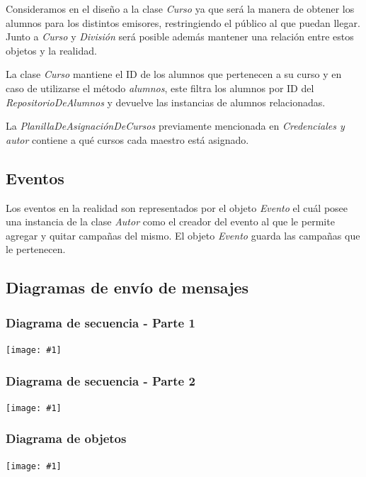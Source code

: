\documentclass[a4paper, 10pt, twoside]{article}
\newcommand{\grafico}[1]{
  \begin{center}
    \texttt{[image: \#1]}
  \end{center}
}
\begin{document}
Consideramos en el diseño a la clase \textit{Curso} ya que será la manera de obtener los alumnos para los distintos 
emisores, restringiendo el público al que puedan llegar. Junto a \textit{Curso} y \textit{División} será posible 
además mantener una relación entre estos objetos y la realidad.

La clase \textit{Curso} mantiene el ID de los alumnos que pertenecen a su curso y en caso de 
utilizarse el método \textit{alumnos}, este filtra los alumnos por ID del \textit{RepositorioDeAlumnos} y 
devuelve las instancias de alumnos relacionadas.

La \textit{PlanillaDeAsignaciónDeCursos} previamente mencionada en \textit{Credenciales y autor} contiene a qué 
cursos cada maestro está asignado.

\subsection{Eventos}
Los eventos en la realidad son representados por el objeto \textit{Evento} el cuál posee una instancia de la clase 
\textit{Autor} como el creador del evento al que le permite agregar y quitar campañas del mismo. El objeto 
\textit{Evento} guarda las campañas que le pertenecen.

\subsection{Diagramas de envío de mensajes}

\subsubsection{Diagrama de secuencia - Parte 1}
\label{sec-envio1}

\grafico{diagramas/secuenciaEnvioDeMensajes1.pdf}

\subsubsection{Diagrama de secuencia - Parte 2}
\label{sec-envio2}

\grafico{diagramas/secuenciaEnvioDeMensajes2.pdf}

\subsubsection{Diagrama de objetos}
\label{obj-envio}

\grafico{diagramas/objetosMensaje.pdf}
\end{document}
